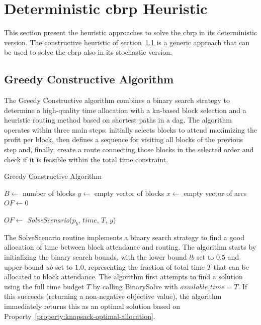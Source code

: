 \section{Deterministic \gls{cbrp} Heuristic}\label{sec:deterministic-heuristics}

This section present the heuristic approaches to solve the \gls{cbrp} in its deterministic version. The constructive heuristic of section~\ref{sec:greedy-constructive-algorithm} is a generic approach that can be used to solve the \gls{cbrp} also in its stochastic version.

\newcommand{\Call}[2]{\textit{#1}(#2)}

\subsection{Greedy Constructive Algorithm}\label{sec:greedy-constructive-algorithm}

The Greedy Constructive algorithm combines a binary search strategy to determine a high-quality time allocation with a \gls{kn}-based block selection and a heuristic routing method based on shortest paths in a \gls{dag}. The algorithm operates within three main steps: initially selects blocks to attend maximizing the profit per block, then defines a sequence for visiting all blocks of the previous step and, finally, create a route connecting those blocks in the selected order and check if it is feasible within the total time constraint.

\begin{algorithm}[h!]
	\caption{Greedy Constructive Algorithm}
	\SetAlgoLined

	$B \leftarrow$ number of blocks\;
	$y \leftarrow$ empty vector of blocks\;
	$x \leftarrow$ empty vector of arcs\;
	$OF \leftarrow 0$\;


	$OF \leftarrow$ \Call{SolveScenario}{$p_b$, $time$, $T$, $y$}\;

	\;
\end{algorithm}

The SolveScenario routine implements a binary search strategy to find a good allocation of time between block attendance and routing. The algorithm starts by initializing the binary search bounds, with the lower bound $lb$ set to $0.5$ and upper bound $ub$ set to $1.0$, representing the fraction of total time $T$ that can be allocated to block attendance. The algorithm first attempts to find a solution using the full time budget $T$ by calling BinarySolve with $available\_time = T$. If this succeeds (returning a non-negative objective value), the algorithm immediately returns this as an optimal solution based on Property~\ref{property:knapsack-optimal-allocation}.

